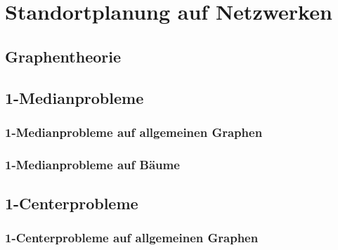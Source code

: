 \section{Standortplanung auf Netzwerken} %
    \label{sec:standortplanung_auf_netzwerken}

      \subsection{Graphentheorie} %
      \label{sub:graphentheorie}
      

      \subsection{1-Medianprobleme} %
      \label{sub:1_medianprobleme}

        \subsubsection{1-Medianprobleme auf allgemeinen Graphen} %
        \label{ssub:1_medianprobleme_auf_allgemeinen_graphen}
        

        \subsubsection{1-Medianprobleme auf Bäume} %
        \label{ssub:1_medianprobleme_auf_b_ume}
        
      

      \subsection{1-Centerprobleme} %
      \label{sub:1_centerprobleme}
      
        \subsubsection{1-Centerprobleme auf allgemeinen Graphen} %
        \label{ssub:1_centerprobleme_auf_allgemeinen_graphen}
        

